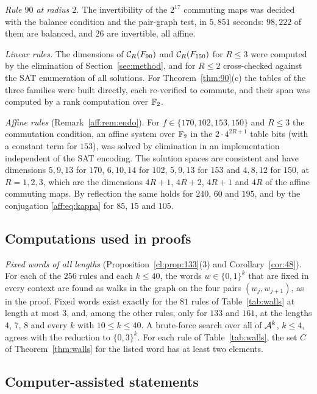 \emph{Rule $90$ at radius $2$.} The invertibility of the $2^{17}$ commuting maps was decided with the balance condition and the pair-graph test, in $5{,}851$ seconds: $98{,}222$ of them are balanced, and $26$ are invertible, all affine.

\emph{Linear rules.} The dimensions of $\mathcal{C}_R(F_{90})$ and $\mathcal{C}_R(F_{150})$ for $R\le3$ were computed by the elimination of Section~\ref{sec:method}, and for $R\le2$ cross-checked against the SAT enumeration of all solutions. For Theorem~\ref{thm:90}(c) the tables of the three families were built directly, each re-verified to commute, and their span was computed by a rank computation over $\mathbb{F}_2$.

\emph{Affine rules} (Remark~\ref{aff:rem:endo}). For $f\in\{170,102,153,150\}$ and $R\le3$ the commutation condition, an affine system over $\mathbb{F}_2$ in the $2\cdot4^{2R+1}$ table bits (with a constant term for $153$), was solved by elimination in an implementation independent of the SAT encoding. The solution spaces are consistent and have dimensions $5,9,13$ for $170$, $6,10,14$ for $102$, $5,9,13$ for $153$ and $4,8,12$ for $150$, at $R=1,2,3$, which are the dimensions $4R+1$, $4R+2$, $4R+1$ and $4R$ of the affine commuting maps. By reflection the same holds for $240$, $60$ and $195$, and by the conjugation \eqref{aff:eq:kappa} for $85$, $15$ and $105$.

\subsection{Computations used in proofs}\label{app:proofs}

\emph{Fixed words of all lengths} (Proposition~\ref{cl:prop:133}(3) and Corollary~\ref{cor:48}). For each of the $256$ rules and each $k\le40$, the words $w\in\{0,1\}^k$ that are fixed in every context are found as walks in the graph on the four pairs $(w_j,w_{j+1})$, as in the proof. Fixed words exist exactly for the $81$ rules of Table~\ref{tab:walls} at length at most $3$, and, among the other rules, only for $133$ and $161$, at the lengths $4$, $7$, $8$ and every $k$ with $10\le k\le40$. A brute-force search over all of $\mathcal{A}^k$, $k\le4$, agrees with the reduction to $\{0,3\}^k$. For each rule of Table~\ref{tab:walls}, the set $C$ of Theorem~\ref{thm:walls} for the listed word has at least two elements.

\subsection{Computer-assisted statements}\label{app:stated}

